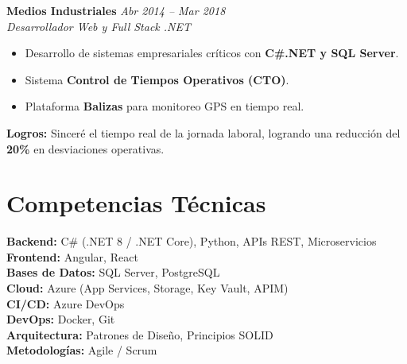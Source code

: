 \documentclass[11pt,a4paper]{article}
\begin{document}
\vspace{9pt}

\textbf{Medios Industriales} \hfill \textit{Abr 2014 – Mar 2018}\\
\textit{Desarrollador Web y Full Stack .NET}

\begin{itemize}[leftmargin=*]
  \item Desarrollo de sistemas empresariales críticos con \textbf{C\#.NET y SQL Server}.
  \item Sistema \textbf{Control de Tiempos Operativos (CTO)}.
  \item Plataforma \textbf{Balizas} para monitoreo GPS en tiempo real.
\end{itemize}
\textbf{Logros:} Sinceré el tiempo real de la jornada laboral, logrando una reducción del \textbf{20\%} en desviaciones operativas.

\section*{Competencias Técnicas}

\textbf{Backend:} C\# (.NET 8 / .NET Core), Python, APIs REST, Microservicios\\
\textbf{Frontend:} Angular, React\\
\textbf{Bases de Datos:} SQL Server, PostgreSQL\\
\textbf{Cloud:} Azure (App Services, Storage, Key Vault, APIM)\\
\textbf{CI/CD:} Azure DevOps\\
\textbf{DevOps:} Docker, Git\\
\textbf{Arquitectura:} Patrones de Diseño, Principios SOLID\\
\textbf{Metodologías:} Agile / Scrum
\end{document}
